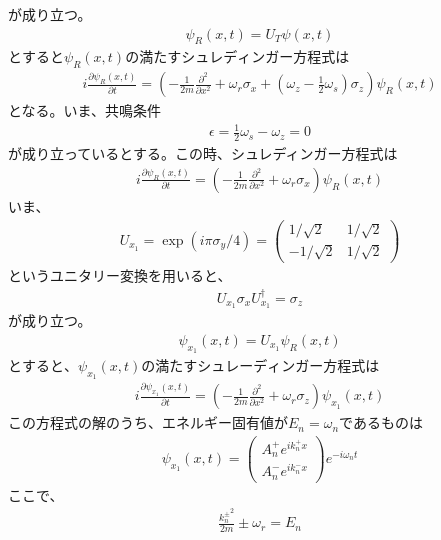 が成り立つ。
\begin{align}
{\psi}_{R}(x,t)=U_{T}{\psi}(x,t)
\end{align}
$とすると{\psi}_{R}(x,t)の満たすシュレディンガー方程式は$
\begin{align}
i\frac{\partial {\psi}_{R}(x,t)}{\partial t}=\left(-\frac{1}{2m}\frac{\partial^2}{\partial x^2}+\omega_{r}{\sigma}_{x}+\left(\omega_{z}-\frac{1}{2}\omega_{s}\right){\sigma}_{z}\right){\psi}_{R}(x,t)
\end{align}
となる。いま、共鳴条件
\begin{align}
{\epsilon}=\frac{1}{2}\omega_{s}-\omega_{z}=0
\end{align}
が成り立っているとする。この時、シュレディンガー方程式は
\begin{align}
i\frac{\partial {\psi}_{R}(x,t)}{\partial t}=\left(-\frac{1}{2m}\frac{\partial^2}{\partial x^2}+\omega_{r}{\sigma}_{x}\right){\psi}_{R}(x,t)
\end{align}
いま、
\begin{align}
U_{x_{1}}=\exp(i{\pi}{\sigma}_{y}/4)=
\begin{pmatrix}
1/\sqrt{2} &1/\sqrt{2} \\
-1/\sqrt{2} &1/\sqrt{2}
\end{pmatrix}
\end{align}
というユニタリー変換を用いると、
\begin{align}
U_{x_{1}}{\sigma}_{x}U_{x_{1}}^{\dagger}={\sigma}_{z}
\end{align}
が成り立つ。
\begin{align}
{\psi}_{x_{1}}(x,t)=U_{x_{1}}{\psi}_{R}(x,t)
\end{align}
$とすると、{\psi}_{x_{1}}(x,t)の満たすシュレーディンガー方程式は$
\begin{align}
i\frac{\partial {\psi}_{x_{1}}(x,t)}{\partial t}=\left(-\frac{1}{2m}\frac{\partial^2}{\partial x^2}+\omega_{r}{\sigma}_{z}\right){\psi}_{x_{1}}(x,t)
\end{align}
$この方程式の解のうち、エネルギー固有値がE_{n}=\omega_{n}であるものは$
\begin{align}
{\psi}_{x_{1}}(x,t) =
\begin{pmatrix}
A_{n}^{+}e^{ik_{n}^{+}x}  \\
A_{n}^{-}e^{ik_{n}^{-}x}
\end{pmatrix}
e^{-i\omega_{n}t}
\end{align}
ここで、
\begin{align}
\frac{{k_{n}^{\pm}}^2}{2m}{\pm}\omega_{r}=E_{n}
\end{align}
